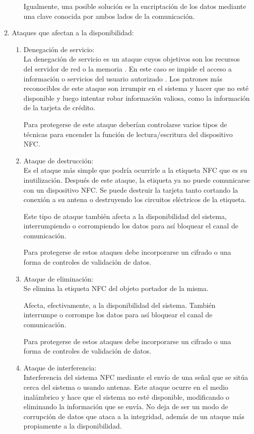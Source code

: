 \documentclass[12pt,a4paper,onecolumn,oneside]{report}
\begin{document}
\begin{enumerate}
\begin{enumerate}
Igualmente, una posible solución es la encriptación de los datos mediante una clave conocida por ambos lados de la comunicación.


\end{enumerate}


\item Ataques que afectan a la disponibilidad:\\
\begin{enumerate}

\item Denegación de servicio:\\
La denegación de servicio es un ataque cuyos objetivos son los recursos del servidor de red o la memoria \cite{siete}. En este caso se impide el acceso a información o servicios del usuario autorizado \cite{ocho}. Los patrones más reconocibles de este ataque son irrumpir en el sistema y hacer que no esté disponible y luego intentar robar información valiosa, como la información de la tarjeta de crédito.

Para protegerse de este ataque deberían controlarse varios tipos de técnicas para encender la función de lectura/escritura del dispositivo NFC.

\item Ataque de destrucción:\\
Es el ataque más simple que podría ocurrirle a la etiqueta NFC que es su inutilización. Después de este ataque, la etiqueta ya no puede comunicarse con un dispositivo NFC. Se puede destruir la tarjeta tanto cortando la conexión a su antena o destruyendo los circuitos eléctricos de la etiqueta. 

Este tipo de ataque también afecta a la disponibilidad del sistema, interrumpiendo o corrompiendo los datos para así bloquear el canal de comunicación.

Para protegerse de estos ataques debe incorporarse un cifrado o una forma de controles de validación de datos.

\item Ataque de eliminación:\\
Se elimina la etiqueta NFC del objeto portador de la misma. 

Afecta, efectivamente, a la disponibilidad del sistema. También  interrumpe o corrompe los datos para así bloquear el canal de comunicación.

Para protegerse de estos ataques debe incorporarse un cifrado o una forma de controles de validación de datos.

\item Ataque de interferencia:\\
Interferencia del sistema NFC mediante el envío de una señal que se sitúa cerca del sistema o usando antenas. Este ataque ocurre en el medio inalámbrico y hace que el sistema no esté disponible, modificando o eliminando la información que se envía. No deja de ser un modo de corrupción de datos que ataca a la integridad, además de un ataque más propiamente a la disponibilidad.


\end{enumerate}
\end{enumerate}
\end{document}
